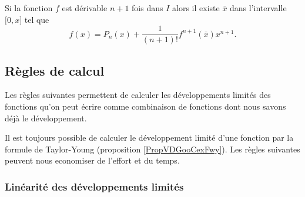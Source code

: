 \begin{proposition}
	Si la fonction \( f\) est dérivable \( n+1\) fois dans \( I\) alors il existe \( \bar x\) dans l'intervalle \( \mathopen[ 0 , x \mathclose]\) tel que
	\begin{equation}
		f(x) = P_n(x) + \frac{1}{(n+1)!} f^{n+1}(\bar x) x^{n+1}.
	\end{equation}
\end{proposition}

\subsection{Règles de calcul}

Les règles suivantes permettent de calculer les développements limités des fonctions qu'on peut écrire comme combinaison de fonctions dont nous savons déjà le développement.

Il est toujours possible de calculer le développement limité d'une fonction par la formule de Taylor-Young (proposition \ref{PropVDGooCexFwy}). Les règles suivantes peuvent nous economiser de l'effort et du temps.

\subsubsection{Linéarité des développements limités}

